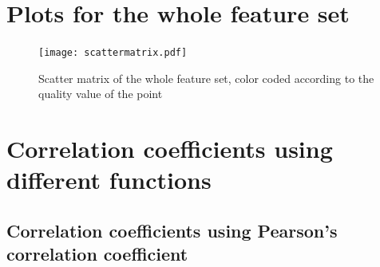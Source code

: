 \documentclass{report}
\begin{document}
\newpage\section{Plots for the whole feature set}

\begin{figure}[H]
\texttt{[image: scattermatrix.pdf]}
\caption{Scatter matrix of the whole feature set, color coded according to the quality value of the point}\n\end{figure}

\section{Correlation coefficients using different functions}

\subsection{Correlation coefficients using Pearson's correlation coefficient}
\end{document}
